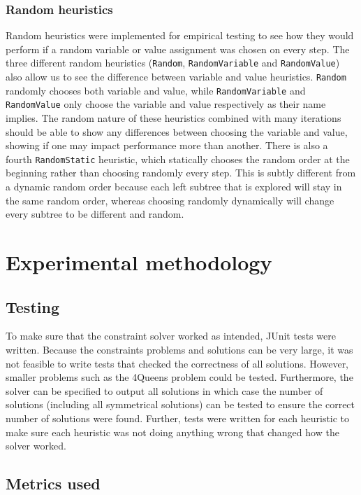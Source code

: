 \documentclass{article}
\begin{document}
\subsubsection{Random heuristics}
Random heuristics were implemented for empirical testing to see how they would perform if a random variable or value assignment was chosen on every step. The three different random heuristics (\texttt{Random}, \texttt{RandomVariable} and \texttt{RandomValue}) also allow us to see the difference between variable and value heuristics. \texttt{Random} randomly chooses both variable and value, while \texttt{RandomVariable} and \texttt{RandomValue} only choose the variable and value respectively as their name implies. The random nature of these heuristics combined with many iterations should be able to show any differences between choosing the variable and value, showing if one may impact performance more than another. There is also a fourth \texttt{RandomStatic} heuristic, which statically chooses the random order at the beginning rather than choosing randomly every step. This is subtly different from a dynamic random order because each left subtree that is explored will stay in the same random order, whereas choosing randomly dynamically will change every subtree to be different and random. 

\section{Experimental methodology}

\subsection{Testing}
To make sure that the constraint solver worked as intended, JUnit tests were written. Because the constraints problems and solutions can be very large, it was not feasible to write tests that checked the correctness of all solutions. However, smaller problems such as the 4Queens problem could be tested. Furthermore, the solver can be specified to output all solutions in which case the number of solutions (including all symmetrical solutions) can be tested to ensure the correct number of solutions were found. 
\n
Further, tests were written for each heuristic to make sure each heuristic was not doing anything wrong that changed how the solver worked. 

\subsection{Metrics used}
\end{document}
